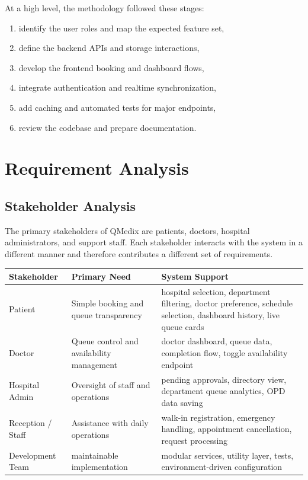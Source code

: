 \documentclass[12pt,onecolumn]{IEEEtran}
\let\oldsection\section
\renewcommand{\section}{\clearpage\oldsection}
\begin{document}
At a high level, the methodology followed these stages:
\begin{enumerate}
    \item identify the user roles and map the expected feature set,
    \item define the backend APIs and storage interactions,
    \item develop the frontend booking and dashboard flows,
    \item integrate authentication and realtime synchronization,
    \item add caching and automated tests for major endpoints,
    \item review the codebase and prepare documentation.
\end{enumerate}

\section{Requirement Analysis}
\subsection{Stakeholder Analysis}
The primary stakeholders of QMedix are patients, doctors, hospital administrators, and support staff. Each stakeholder interacts with the system in a different manner and therefore contributes a different set of requirements.

\begin{longtable}{p{}p{}p{}}
\toprule
\textbf{Stakeholder} & \textbf{Primary Need} & \textbf{System Support} \\
\midrule
Patient & Simple booking and queue transparency & hospital selection, department filtering, doctor preference, schedule selection, dashboard history, live queue cards \\
Doctor & Queue control and availability management & doctor dashboard, queue data, completion flow, toggle availability endpoint \\
Hospital Admin & Oversight of staff and operations & pending approvals, directory view, department queue analytics, OPD data saving \\
Reception / Staff & Assistance with daily operations & walk-in registration, emergency handling, appointment cancellation, request processing \\
Development Team & maintainable implementation & modular services, utility layer, tests, environment-driven configuration \\
\bottomrule
\end{longtable}
\end{document}
